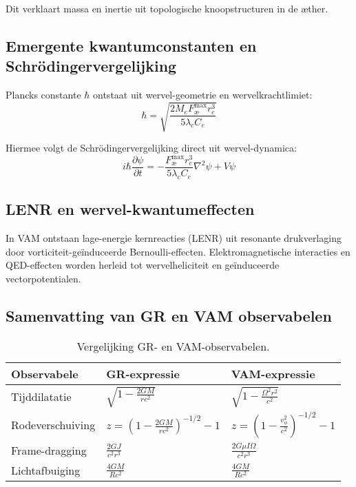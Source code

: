 Dit verklaart massa en inertie uit topologische knoopstructuren in de æther.

\subsection*{Emergente kwantumconstanten en Schrödingervergelijking}

Plancks constante $\hbar$ ontstaat uit wervel-geometrie en wervelkrachtlimiet:
\begin{equation}
    \hbar = \sqrt{\frac{2M_e F^{\text{max}}_{\text{\ae}} r_c^3}{5 \lambda_c C_e}}
\end{equation}

Hiermee volgt de Schrödingervergelijking direct uit wervel-dynamica:
\begin{equation}
    i \hbar \frac{\partial \psi}{\partial t} = -\frac{F^{\text{max}}_{\text{\ae}} r_c^3}{5 \lambda_c C_e}\nabla^2 \psi + V\psi
\end{equation}


\subsection*{LENR en wervel-kwantumeffecten}

In VAM ontstaan lage-energie kernreacties (LENR) uit resonante drukverlaging door vorticiteit-geïnduceerde Bernoulli-effecten. Elektromagnetische interacties en QED-effecten worden herleid tot wervelheliciteit en geïnduceerde vectorpotentialen.

\subsection*{Samenvatting van GR en VAM observabelen}

\begin{table}[h!]
    \centering
    \begin{tabular}{lll}
        \toprule
        \textbf{Observabele} & \textbf{GR-expressie} & \textbf{VAM-expressie} \\
        \midrule
        Tijddilatatie & $\sqrt{1-\frac{2GM}{rc^2}}$ & $\sqrt{1-\frac{\Omega^2 r^2}{c^2}}$\\[0.5em]
        Rodeverschuiving & $z=\left(1-\frac{2GM}{rc^2}\right)^{-1/2}-1$ & $z=\left(1-\frac{v_\phi^2}{c^2}\right)^{-1/2}-1$\\[0.5em]
        Frame-dragging & $\frac{2GJ}{c^2 r^3}$ & $\frac{2G\mu I\Omega}{c^2 r^3}$\\[0.5em]
        Lichtafbuiging & $\frac{4GM}{Rc^2}$ & $\frac{4GM}{Rc^2}$\\
        \bottomrule
    \end{tabular}
    \caption{Vergelijking GR- en VAM-observabelen.}
    \label{tab:vergelijkingen}
\end{table}